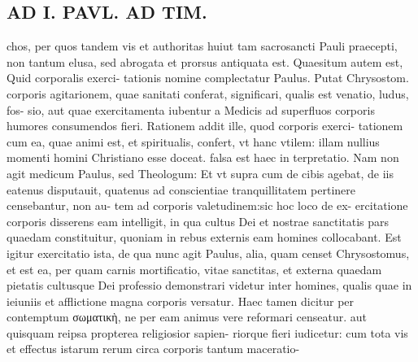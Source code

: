 \documentclass{article}
\begin{document}
\begin{pages}
\section*{AD I. PAVL. AD TIM. }
\marginpar{[ p.208 ]}\pstart chos, per quos tandem vis et authoritas huiut tam sacrosancti Pauli praecepti, non tantum elusa, sed abrogata et prorsus antiquata est. Quaesitum autem est, Quid corporalis exerci- tationis nomine complectatur Paulus. Putat Chrysostom. corporis agitarionem, quae sanitati conferat, significari, qualis est venatio, ludus, fos- sio, aut quae exercitamenta iubentur a Medicis ad superfluos corporis humores consumendos fieri. Rationem addit ille, quod corporis exerci- tationem cum ea, quae animi est, et spiritualis, confert, vt hanc vtilem: illam nullius momenti homini Christiano esse doceat. falsa est haec in terpretatio. Nam non agit medicum Paulus, sed Theologum: Et vt supra cum de cibis agebat, de iis eatenus disputauit, quatenus ad conscientiae tranquillitatem pertinere censebantur, non au- tem ad corporis valetudinem:sic hoc loco de ex- ercitatione corporis disserens eam intelligit, in qua cultus Dei et nostrae sanctitatis pars quaedam constituitur, quoniam in rebus externis eam homines collocabant. Est igitur exercitatio ista, de qua nunc agit Paulus, alia, quam censet Chrysostomus, et est ea, per quam carnis mortificatio, vitae sanctitas, et externa quaedam pietatis cultusque Dei professio demonstrari videtur inter homines, qualis quae in ieiuniis et afflictione magna corporis versatur. Haec tamen dicitur per contemptum σωματικὴ, ne per eam animus vere reformari censeatur. aut quisquam reipsa propterea religiosior sapien- riorque fieri iudicetur: cum tota vis et effectus istarum rerum circa corporis tantum maceratio-  \pend

\end{pages}
\end{document}
